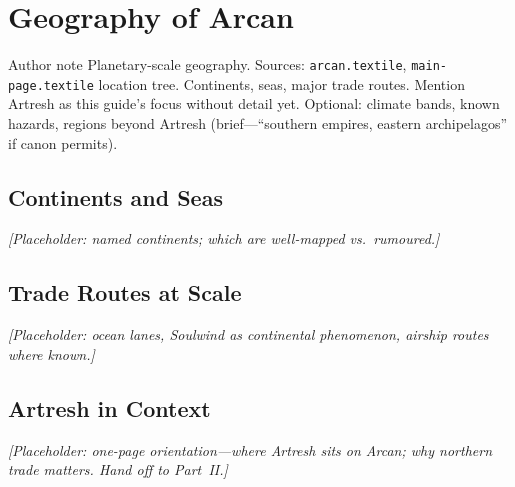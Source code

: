 \chapter{Geography of Arcan}

\begin{DndComment}{Author note}
  Planetary-scale geography. Sources: \texttt{arcan.textile}, \texttt{main-page.textile} location tree.
  Continents, seas, major trade routes. Mention Artresh as this guide's focus without detail yet.
  Optional: climate bands, known hazards, regions beyond Artresh (brief---``southern empires, eastern archipelagos'' if canon permits).
\end{DndComment}

\section{Continents and Seas}

\textit{[Placeholder: named continents; which are well-mapped vs.\ rumoured.]}

\section{Trade Routes at Scale}

\textit{[Placeholder: ocean lanes, Soulwind as continental phenomenon, airship routes where known.]}

\section{Artresh in Context}

\textit{[Placeholder: one-page orientation---where Artresh sits on Arcan; why northern trade matters. Hand off to Part~II.]}
